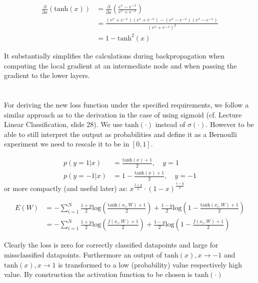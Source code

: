 \documentclass[11pt]{article}
\newcommand{\exercise}{\section{}}
\newcommand{\sumf}[3]{\sum_{#1}^{#2} #3}
\newcommand{\partialf}[1]{\frac{\partial}{{\partial #1}}}
\begin{document}
\exercise



\exercise

\exercise

\begin{align*}
\partialf{x}(\text{tanh}(x)) &= \partialf{x}(\frac{e^x - e^{-x}}{e^x + e^{-x}}) \\
&= \frac{ ( e^x + e^{-x} )( e^x + e^{-x}) - ( e^x - e^{-x} )( e^x - e^{-x} )}{ ( e^x + e^{-x} )^2 } \\
&= 1 - \text{tanh}^2(x)
\end{align*}

It substantially simplifies the calculations during backpropagation when computing the local gradient at an intermediate node and when passing the gradient to the lower layers.

\exercise

For deriving the new loss function under the specified requirements, we follow a similar approach as to the derivation in the case of using sigmoid (cf. Lecture Linear Classification, slide 28). We use $ \text{tanh}( \cdot ) $ instead of $\sigma( \cdot )$. However to be able to still interpret the output as probabilities and define it as a Bernoulli experiment we need to rescale it to be in $[0, 1]$.

\begin{align*}
p( y = 1 | x) &=\frac{\text{tanh}(x) + 1}{2}, \quad y = 1 \\
p( y = -1 | x) &=1 - \frac{\text{tanh}(x) + 1}{2}, \quad y = -1
\end{align*}
or more compactly (and useful later) as:
$x^{\frac{1 + y}{2}} \cdot (1 - x)^{\frac{1 - y}{2}}$

\begin{align*}
E(W) &= -\sumf{i = 1}{N}{ \frac{1 + y}{2} \text{log}(\frac{\text{tanh}(x_i, W) + 1}{2}) + \frac{1 - y}{2} \text{log}(1 - \frac{\text{tanh}(x_i, W) + 1}{2})} \\
&= -\sumf{i = 1}{N}{ \frac{1 + y}{2} \text{log}(\frac{f(x_i, W) + 1}{2}) + \frac{1 - y}{2} \text{log}(1 - \frac{f(x_i, W) + 1}{2})}
\end{align*}

Clearly the loss is zero for correctly classified datapoints and large for missclassified datapoints. Furthermore an output of $\text{tanh}(x), x \rightarrow -1$ and  $\text{tanh}(x), x \rightarrow 1$ is transformed to a low (probability) value respectively high value. By construction the activation function to be chosen is $\text{tanh}(\cdot)$
\end{document}
